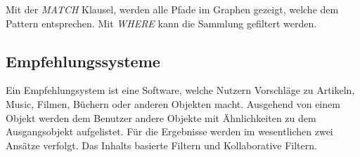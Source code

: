 % 

Mit der \textit{MATCH} Klausel, werden alle Pfade im Graphen gezeigt, welche dem Pattern entsprechen. Mit \textit{WHERE} kann die Sammlung gefiltert werden.

\subsection{Empfehlungssysteme}

Ein Empfehlungsystem ist eine Software, welche Nutzern Vorschläge zu Artikeln, Music, Filmen, Büchern oder anderen Objekten macht. \cite{Ricci2010} Ausgehend von einem Objekt werden dem Benutzer andere Objekte mit Ähnlichkeiten zu dem Ausgangsobjekt aufgelistet. Für die Ergebnisse werden im wesentlichen zwei Ansätze verfolgt. Das Inhalts basierte Filtern und Kollaborative Filtern.


 
	
